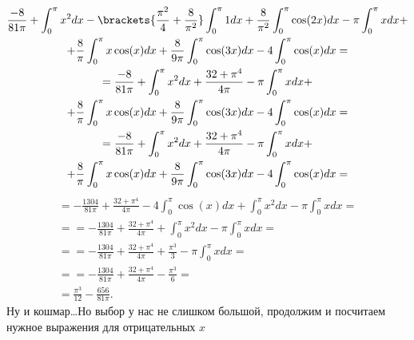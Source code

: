 \begin{gather*}
    \frac{-8}{81\pi} + \int_0^\pi x^2dx - \brackets{\frac{\pi^2}{4} + \frac{8}{\pi^2}}\int_0^\pi 1dx + \frac{8}{\pi^2}\int_0^\pi \cos(2x)dx - \pi\int_0^\pi xdx + \\ + \frac{8}{\pi}\int_0^\pi x\cos(x)dx + \frac{8}{9\pi}\int_0^\pi \cos(3x)dx - 4\int_0^\pi \cos(x)dx = \\ = 
    \frac{-8}{81\pi} + \int_0^\pi x^2dx + \frac{32+\pi^4}{4\pi} - \pi\int_0^\pi xdx + \\ + \frac{8}{\pi}\int_0^\pi x\cos(x)dx + \frac{8}{9\pi}\int_0^\pi \cos(3x)dx - 4\int_0^\pi \cos(x)dx = \\ = 
    \frac{-8}{81\pi} + \int_0^\pi x^2dx + \frac{32+\pi^4}{4\pi} - \pi\int_0^\pi xdx + \\ + \frac{8}{\pi}\int_0^\pi x\cos(x)dx + \frac{8}{9\pi}\int_0^\pi \cos(3x)dx - 4\int_0^\pi \cos(x)dx = 
\end{gather*}
\begin{gather*}
    =-\frac{1304}{81\pi} + \frac{32+\pi^4}{4\pi} - 4\int_0^\pi \cos(x)dx + \int_0^\pi x^2dx - \pi\int_0^\pi xdx = \\ = 
    =-\frac{1304}{81\pi} + \frac{32+\pi^4}{4\pi} + \int_0^\pi x^2dx - \pi\int_0^\pi xdx = \\ = 
    =-\frac{1304}{81\pi} + \frac{32+\pi^4}{4\pi} + \frac{\pi^3}{3} - \pi\int_0^\pi xdx = \\ = 
    =-\frac{1304}{81\pi} + \frac{32+\pi^4}{4\pi} - \frac{\pi^3}{6} = \\ = \frac{\pi^3}{12} - \frac{656}{81\pi}.
\end{gather*}
Ну и кошмар\ldots Но выбор у нас не слишком большой, продолжим и посчитаем нужное выражения для отрицательных $x$
